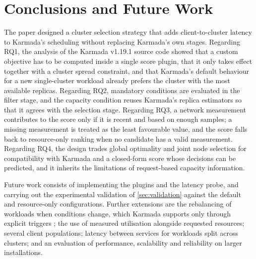 \section{Conclusions and Future Work}\label{sec:conclusions}

The paper designed a cluster selection strategy that adds client-to-cluster latency to Karmada's scheduling without replacing Karmada's own stages. Regarding RQ1, the analysis of the Karmada v1.19.1 source code showed that a custom objective has to be computed inside a single score plugin, that it only takes effect together with a cluster spread constraint, and that Karmada's default behaviour for a new single-cluster workload already prefers the cluster with the most available replicas. Regarding RQ2, mandatory conditions are evaluated in the filter stage, and the capacity condition reuses Karmada's replica estimators so that it agrees with the selection stage. Regarding RQ3, a network measurement contributes to the score only if it is recent and based on enough samples; a missing measurement is treated as the least favourable value, and the score falls back to resource-only ranking when no candidate has a valid measurement. Regarding RQ4, the design trades global optimality and joint node selection for compatibility with Karmada and a closed-form score whose decisions can be predicted, and it inherits the limitations of request-based capacity information.

Future work consists of implementing the plugins and the latency probe, and carrying out the experimental validation of \cref{sec:validation} against the default and resource-only configurations. Further extensions are the rebalancing of workloads when conditions change, which Karmada supports only through explicit triggers \cite{karmada_docs_rebalancer}; the use of measured utilisation alongside requested resources; several client populations; latency between services for workloads split across clusters; and an evaluation of performance, scalability and reliability on larger installations.
